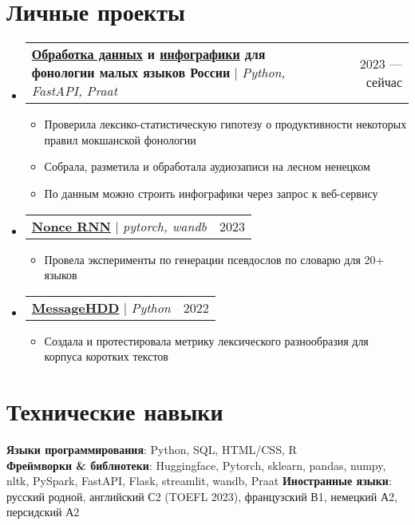 \documentclass[letterpaper,11pt]{article}
\makeatletter
\newcommand{\resumeItem}[1]{
  \item\small{
    {#1 \vspace{-2pt}}
  }
}
\newcommand{\resumeProjectHeading}[2]{
    \item
    \begin{tabular*}{0.97\textwidth}{l@{\extracolsep{\fill}}r}
      \small#1 & #2 \\
    \end{tabular*}\vspace{-7pt}
}
\newcommand{\resumeSubHeadingListStart}{\begin{itemize}[leftmargin=0.15in, label={}]}
\newcommand{\resumeSubHeadingListEnd}{\end{itemize}}
\newcommand{\resumeItemListStart}{\begin{itemize}}
\newcommand{\resumeItemListEnd}{\end{itemize}\vspace{-5pt}}
\makeatother
\begin{document}
\section{Личные проекты}
    \resumeSubHeadingListStart
      \resumeProjectHeading
          {\textbf{\href{https://github.com/thddbptnsndshs/tolerance_principle_moksha}{Обработка данных} и \href{https://github.com/thddbptnsndshs/forest_nenets_vowels}{инфографики} для фонологии малых языков России} $|$ \emph{Python, FastAPI, Praat}}{2023 --- сейчас}
          \resumeItemListStart
            \resumeItem{Проверила лексико-статистическую гипотезу о продуктивности некоторых правил мокшанской фонологии}
            \resumeItem{Собрала, разметила и обработала аудиозаписи на лесном ненецком}
            \resumeItem{По данным можно строить инфографики через запрос к веб-сервису}
          \resumeItemListEnd
      \resumeProjectHeading
          {\href{https://github.com/thddbptnsndshs/nonce-words}{\textbf{Nonce RNN}} $|$ \emph{pytorch, wandb}}{2023}
          \resumeItemListStart
            \resumeItem{Провела эксперименты по генерации псевдослов по словарю для 20+ языков}
          \resumeItemListEnd
      \resumeProjectHeading
          {\href{https://github.com/thddbptnsndshs/MessageHDD}{\textbf{MessageHDD}} $|$ \emph{Python}}{2022}
          \resumeItemListStart
            \resumeItem{Создала и протестировала метрику лексического разнообразия для корпуса коротких текстов}
          \resumeItemListEnd
    \resumeSubHeadingListEnd



%
\section{Технические навыки}
 \begin{itemize}[leftmargin=0.15in, label={}]
    \small{\item{
     \textbf{Языки программирования}{: Python, SQL, HTML/CSS, R} \\
     \textbf{Фреймворки \& библиотеки}{: Huggingface, Pytorch, sklearn, pandas, numpy, nltk, PySpark, FastAPI, Flask, streamlit, wandb, Praat}
     \textbf{Иностранные языки}{: русский родной, английский С2 (TOEFL 2023), французский В1, немецкий А2, персидский А2}
    }}
 \end{itemize}


\end{document}
